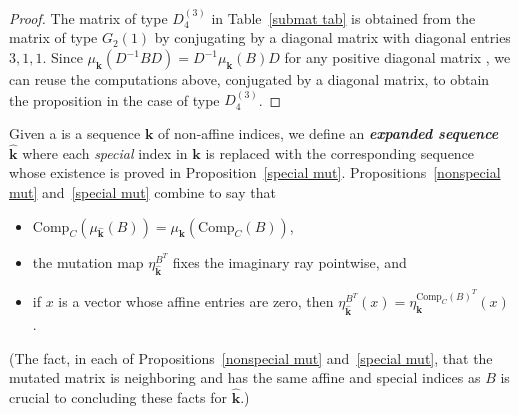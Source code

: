 \documentclass[10pt]{article}
\theoremstyle{definition}
\theoremstyle{remark}
\numberwithin{equation}{section}
\newcommand{\newword}[1]{\textbf{\emph{#1}}}
\newcommand{\0}{{\mathbf{0}}}
\newcommand{\Comp}{\mathrm{Comp}_C}
\newcommand{\kk}{{\boldsymbol{k}}}
\begin{document}
\begin{proof}
The matrix of type $D_4^{(3)}$ in Table~\ref{submat tab} is obtained from the matrix of type $G_2{(1)}$ by conjugating by a diagonal matrix with diagonal entries $3,1,1$.
Since $\mu_\kk(D^{-1}BD)=D^{-1}\mu_\kk(B)D$ for any positive diagonal matrix \cite[Proposition~4.5]{ca1}, we can reuse the computations above, conjugated by a diagonal matrix, to obtain the proposition in the case of type $D_4^{(3)}$.
\end{proof}

Given a  is a sequence $\kk$ of non-affine indices, we define an \newword{expanded sequence}~$\widehat\kk$ 
where each \emph{special} index in $\kk$ is replaced with the corresponding sequence whose existence is proved in Proposition~\ref{special mut}.
Propositions~\ref{nonspecial mut} and~\ref{special mut} combine to say that 
\begin{itemize}
\item
$\Comp(\mu_{\widehat\kk}(B))=\mu_\kk(\Comp(B))$,
\item
the mutation map $\eta^{B^T}_{\widehat\kk}$ fixes the imaginary ray pointwise, and 
\item
if $x$ is a vector whose affine entries are zero, then $\eta^{B^T}_{\widehat\kk}(x)=\eta^{\Comp(B)^T}_\kk(x)$.
\end{itemize}
(The fact, in each of Propositions~\ref{nonspecial mut} and~\ref{special mut}, that the mutated matrix is neighboring and has the same affine and special indices as $B$ is crucial to concluding these facts for $\widehat\kk$.)
\end{document}
